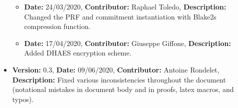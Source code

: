 \begin{itemize}
\begin{itemize}
            \item \textbf{Date:} 24/03/2020, \textbf{Contributor:} Raphael Toledo, \textbf{Description:} Changed the PRF and commitment instantiation with Blake2s compression function.
            \item \textbf{Date:} 17/04/2020, \textbf{Contributor:} Giuseppe Giffone, \textbf{Description:} Added DHAES encryption scheme.
        \end{itemize}
    \item \textbf{Version:} 0.3, \textbf{Date:} 09/06/2020, \textbf{Contributor:} Antoine Rondelet, \textbf{Description:} Fixed various inconsistencies throughout the document (notational mistakes in document body and in proofs, latex macros, and typos).
\end{itemize}
